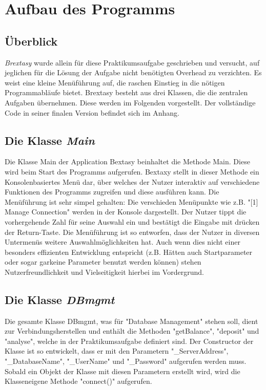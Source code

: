 \section{Aufbau des Programms}
	\subsection{Überblick}
		\emph{Brextasy} wurde allein für diese Praktikumsaufgabe geschrieben und versucht, auf jeglichen für die Lösung der Aufgabe nicht benötigten Overhead zu verzichten. Es weist eine kleine Menüführung auf, die raschen Einstieg in die nötigen Programmabläufe bietet.
		Brextasy besteht aus drei Klassen, die die zentralen Aufgaben übernehmen. Diese werden im Folgenden vorgestellt. Der vollständige Code in seiner finalen Version befindet sich im Anhang.
	\subsection{Die Klasse \emph{Main}}
	Die Klasse Main der Application Bextasy beinhaltet die Methode Main. Diese wird beim Start des Programms aufgerufen.
	Bextaxy stellt in dieser Methode ein Konsolenbasiertes Menü dar, über welches der Nutzer interaktiv auf verschiedene Funktionen des Programms zugreifen und diese ausführen kann.
	Die Menüführung ist sehr simpel gehalten: Die verschieden Menüpunkte wie z.B. "[1] Manage Connection" werden in der Konsole dargestellt. Der Nutzer tippt die vorhergehende Zahl für seine Auswahl ein und bestätigt die Eingabe mit drücken der Return-Taste.
	Die Menüführung ist so entworfen, dass der Nutzer in diversen Untermenüs weitere Auswahlmöglichkeiten hat.
	Auch wenn dies nicht einer besonders effizienten Entwicklung entspricht (z.B. Hätten auch Startparameter oder sogar garkeine Parameter benutzt werden können) stehen Nutzerfreundlichkeit und Vielseitigkeit hierbei im Vordergrund.

	\subsection{Die Klasse \emph{DBmgmt}}
	Die gesamte Klasse DBmgmt, was für "Database Management" stehen soll, dient zur Verbindungsherstellen und enthält die Methoden "getBalance", "deposit" und "analyse", welche in der Praktikumsaufgabe definiert sind.
Der Constructor der Klasse ist so entwickelt, dass er mit den Parametern "\_ServerAddress", "\_DatabaseName", "\_UserName" und "\_Password" aufgerufen werden muss.
Sobald ein Objekt der Klasse mit diesen Parametern erstellt wird, wird die Klasseneigene Methode "connect()" aufgerufen.

